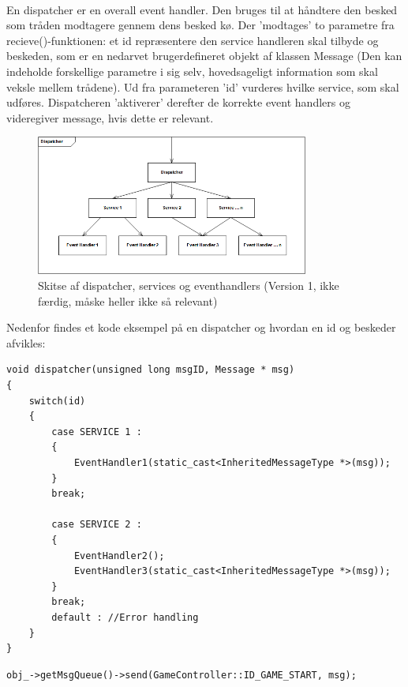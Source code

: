 \documentclass[Softwaredesign/Softwaredesign_main.tex]{subfiles}
\begin{document}
\\En dispatcher er en overall event handler. Den bruges til at håndtere den besked som tråden modtagere gennem dens besked kø. Der 'modtages' to parametre fra recieve()-funktionen: et id repræsentere den service handleren skal tilbyde og beskeden, som er en nedarvet brugerdefineret objekt af klassen Message (Den kan indeholde forskellige parametre i sig selv, hovedsageligt information som skal veksle mellem trådene). Ud fra parameteren 'id' vurderes hvilke service, som skal udføres. Dispatcheren 'aktiverer' derefter de korrekte event handlers og videregiver message, hvis dette er relevant. 
\begin{figure}[H]
    \centering
    \includegraphics[width=0.8\textwidth]{Softwaredesign/RPiApp/graphic_RPi/dispatch.png}
    \caption{Skitse af dispatcher, services og eventhandlers (Version 1, ikke færdig, måske heller ikke så relevant)}
    \label{fig:dispatch}
\end{figure}
Nedenfor findes et kode eksempel på en dispatcher og hvordan en id og beskeder afvikles: 
\begin{lstlisting}
void dispatcher(unsigned long msgID, Message * msg)
{
    switch(id) 
    {
        case SERVICE 1 :
        {
            EventHandler1(static_cast<InheritedMessageType *>(msg)); 
        }
        break;
        
        case SERVICE 2 : 
        {
            EventHandler2(); 
            EventHandler3(static_cast<InheritedMessageType *>(msg));
        }
        break;
        default : //Error handling
    }
}
\end{lstlisting}


\begin{lstlisting}
obj_->getMsgQueue()->send(GameController::ID_GAME_START, msg); 
\end{lstlisting}
\end{document}
